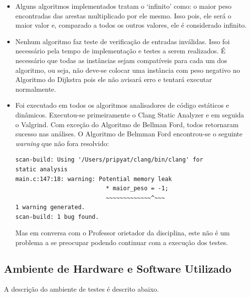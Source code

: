 \documentclass[12pt]{article}
\begin{document}
\begin{itemize}
	\item Alguns algoritmos implementados tratam o `infinito' como: o maior peso encontradas das arestas multiplicado por ele mesmo. \newline
    	Isso pois, ele será o maior valor e, comparado a todos os outros valores, ele é considerado infinito.
        
    \item Nenhum algoritmo faz teste de verificação de entradas inválidas. \newline
    	Isso foi necessário pela tempo de implementação e testes a serem realizados. É necessário que todas as instâncias sejam compatíveis para cada um dos algoritmo, ou seja, não deve-se colocar uma instância com peso negativo no Algoritmo do Dijkstra pois ele não avisará erro e tentará executar normalmente. 
        
    \item Foi executado em todos os algoritmos analisadores de código estáticos e dinâmicos. Executou-se primeiramente o Clang Static Analyzer e em seguida o Valgrind. Com exceção do Algoritmo de Bellman Ford, todos retornaram sucesso nas análises.\newline 
    O Algoritmo de Belmman Ford encontrou-se o seguinte \textit{warning} que não fora resolvido:

\begin{verbatim}
scan-build: Using '/Users/pripyat/clang/bin/clang' for 
static analysis
main.c:147:18: warning: Potential memory leak
                          * maior_peso = -1;
                          ~~~~~~~~~~~~~^~~~
1 warning generated.
scan-build: 1 bug found.
\end{verbatim}

    Mas em conversa com o Professor orietador da disciplina, este não é um problema a se preocupar podendo continuar com a execução dos testes.
        
       
\end{itemize}


\subsection{Ambiente de Hardware e Software Utilizado}

A descrição do ambiente de testes é descrito abaixo.
\end{document}
